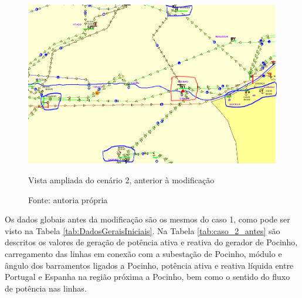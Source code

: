 \begin{figure}[H]
	\centering
	\captionsetup{width=\textwidth, font=footnotesize, textfont=bf}	
	\includegraphics[width=\linewidth]{img/caso_2_antes_expandido.PNG}
	\caption{Vista ampliada do cenário 2, anterior à modificação}
	\vspace{-3.5mm}
	\caption*{Fonte: autoria própria}
	\label{fig:caso_2_antes_geral}
\end{figure}

Os dados globais antes da modificação são os mesmos do caso 1, como pode ser visto na Tabela \ref{tab:DadosGeraisIniciais}. Na Tabela \ref{tab:caso_2_antes} são descritos os valores de geração de potência ativa e reativa do gerador de Pocinho, carregamento das linhas em conexão com a subestação de Pocinho, módulo e ângulo dos barramentos ligados a Pocinho, potência ativa e reativa líquida entre Portugal e Espanha na região próxima a Pocinho, bem como o sentido do fluxo de potência nas linhas.

